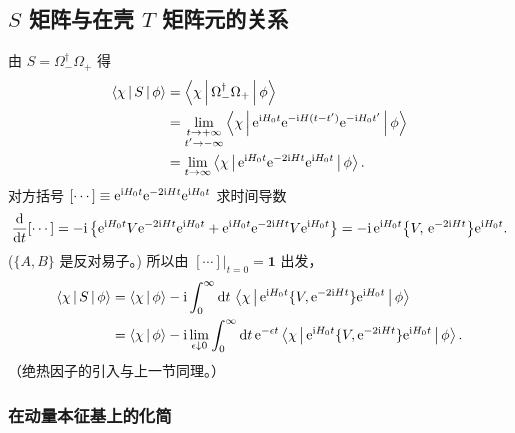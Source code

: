 \subsection{$S$ 矩阵与在壳 $T$ 矩阵元的关系}

由 $S = \Omega_-^\dagger\Omega_+$ 得
\begin{align}
  \matel{\chi}{S}{\phi}
  &= \matel{\chi}{\Omega_-^\dagger\Omega_+}{\phi}\notag\\
  &= \lim_{\substack{t\to+\infty\\ t'\to-\infty}}
     \matel{\chi}{\rme^{\rmi H_0 t}\rme^{-\rmi H(t-t')}\rme^{-\rmi H_0 t'}}{\phi}\notag\\
  &= \lim_{t\to\infty}
     \matel{\chi}{\rme^{\rmi H_0 t}\rme^{-2\rmi H t}\rme^{\rmi H_0 t}}{\phi}.
\end{align}
对方括号 $[\cdots]\equiv \rme^{\rmi H_0 t}\rme^{-2\rmi Ht}\rme^{\rmi H_0 t}$ 求时间导数
\begin{equation}
  \frac{\rmd}{\rmd t}[\cdots]
  = -\rmi\,\bigl\{\rme^{\rmi H_0 t}V\rme^{-2\rmi Ht}\rme^{\rmi H_0 t}
                + \rme^{\rmi H_0 t}\rme^{-2\rmi Ht}V\rme^{\rmi H_0 t}\bigr\}
  = -\rmi\,\rme^{\rmi H_0 t}\bigl\{V,\,\rme^{-2\rmi Ht}\bigr\}\rme^{\rmi H_0 t}.
\end{equation}
($\{A,B\}$ 是反对易子。)
所以由 $[\cdots]\big|_{t=0}=\mathbf 1$ 出发，
\begin{align}
  \matel{\chi}{S}{\phi}
  &= \inn{\chi}{\phi} - \rmi\int_0^\infty\rmd t\,
     \matel{\chi}{\rme^{\rmi H_0 t}\{V,\rme^{-2\rmi Ht}\}\rme^{\rmi H_0 t}}{\phi}\notag\\
  &= \inn{\chi}{\phi} - \rmi\lim_{\epsilon\downarrow 0}\int_0^\infty\rmd t\,
     \rme^{-\epsilon t}
     \matel{\chi}{\rme^{\rmi H_0 t}\{V,\rme^{-2\rmi Ht}\}\rme^{\rmi H_0 t}}{\phi}.
\end{align}
（绝热因子的引入与上一节同理。）

\subsubsection*{在动量本征基上的化简}

